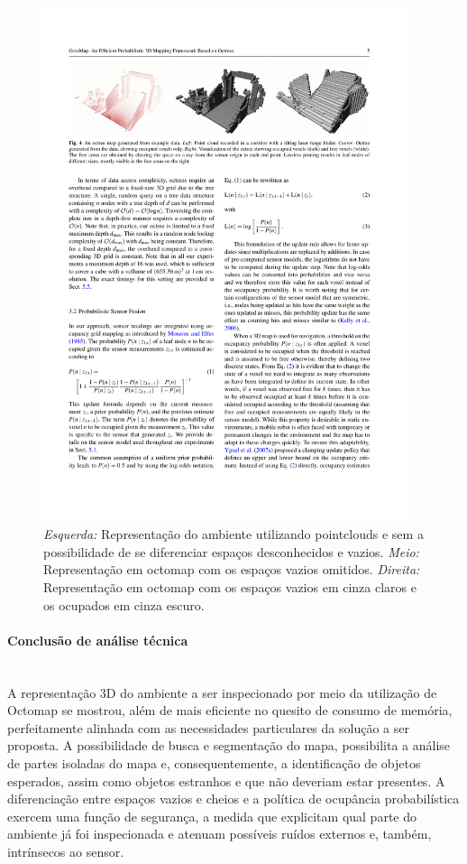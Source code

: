\begin{itemize}
    \begin{figure}[h!]
     \centering
    \includegraphics[width=0.95\textwidth]{figs/3d/free}
    \caption{\textit{Esquerda:} Representação do ambiente utilizando pointclouds e sem a possibilidade de se diferenciar espaços desconhecidos e vazios. \textit{Meio:} Representação em octomap com os espaços vazios omitidos. \textit{Direita:} Representação em octomap com os espaços vazios em cinza claros e os ocupados em cinza escuro.}
    \label{fig:free}
\end{figure}
\end{itemize}

\paragraph{Conclusão de análise técnica}\mbox{}\\
A representação 3D do ambiente a ser inspecionado por meio da utilização de Octomap se mostrou, além de mais eficiente no quesito de consumo de memória, perfeitamente alinhada com as necessidades particulares da solução a ser proposta. A possibilidade de busca e segmentação do mapa, possibilita a análise de partes isoladas do mapa e, consequentemente, a identificação de objetos esperados, assim como objetos estranhos e que não deveriam estar presentes. A diferenciação entre espaços vazios e cheios e a política de ocupância probabilística exercem uma função de segurança, a medida que explicitam qual parte do ambiente já foi inspecionada e atenuam possíveis ruídos externos e, também, intrínsecos ao sensor.
